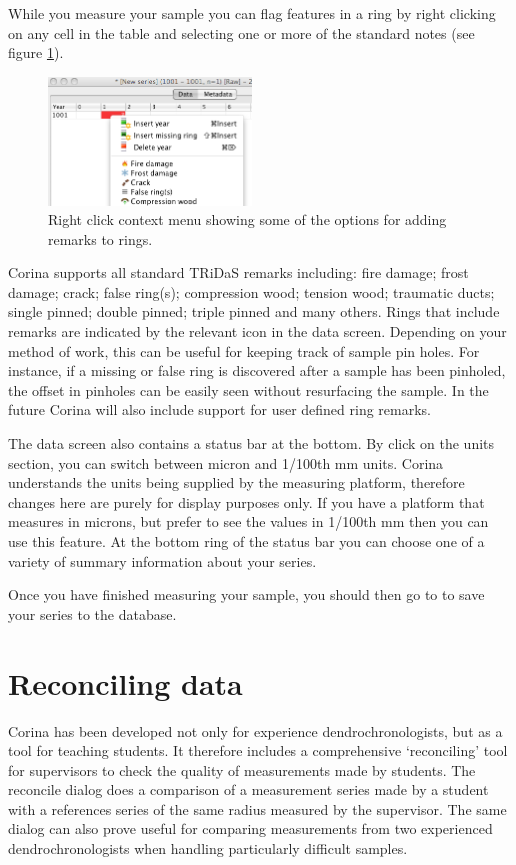 While you measure your sample you can flag features in a ring by right clicking on any cell in the table and selecting one or more of the standard notes (see figure \ref{fig:ringremarks}).

\begin{figure}
  \begin{center}
    \includegraphics[width=0.48\textwidth]{Images/ringremarks.png}
  \end{center}
  \caption{Right click context menu showing some of the options for adding remarks to rings.}
  \label{fig:ringremarks}
\end{figure}

Corina supports all standard TRiDaS remarks including: fire damage; frost damage; crack; false ring(s); compression wood; tension wood; traumatic ducts; single pinned; double pinned; triple pinned and many others.  Rings that include remarks are indicated by the relevant icon in the data screen.  Depending on your method of work, this can be useful for keeping track of sample pin holes.  For instance, if a missing or false ring is discovered after a sample has been pinholed, the offset in pinholes can be easily seen without resurfacing the sample.  In the future Corina will also include support for user defined ring remarks.  

The data screen also contains a status bar at the bottom. By click on the units section, you can switch between micron and 1/100th mm units. Corina understands the units being supplied by the measuring platform, therefore changes here are purely for display purposes only. If you have a platform that measures in microns, but prefer to see the values in 1/100th mm then you can use this feature. At the bottom ring of the status bar you can choose one of a variety of summary information about your series.

Once you have finished measuring your sample, you should then go to  to save your series to the database. 

\section{Reconciling data}
Corina has been developed not only for experience dendrochronologists, but as a tool for teaching students.  It therefore includes a comprehensive `reconciling' tool for supervisors to check the quality of measurements made by students.  The reconcile dialog does a comparison of a measurement series made by a student with a references series of the same radius measured by the supervisor.  The same dialog can also prove useful for comparing measurements from two experienced dendrochronologists when handling particularly difficult samples.

 


